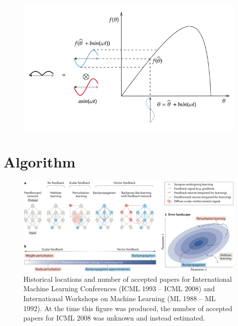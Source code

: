 \documentclass[nohyperref]{article}
\theoremstyle{plain}
\theoremstyle{definition}
\theoremstyle{remark}
\begin{document}
\begin{figure}[ht]
\vskip 0.2in
\begin{center}
\centerline{\includegraphics[width=\columnwidth]{images/esc_increasing_objective.png}}
\caption{}
\end{center}
\vskip -0.2in
\end{figure}


\section{Algorithm}
\begin{figure}[ht]
\vskip 0.2in
\begin{center}
\centerline{\includegraphics[width=2\columnwidth]{images/grad_landscape.png}}
\caption{Historical locations and number of accepted papers for International
Machine Learning Conferences (ICML 1993 -- ICML 2008) and International
Workshops on Machine Learning (ML 1988 -- ML 1992). At the time this figure was
produced, the number of accepted papers for ICML 2008 was unknown and instead
estimated.}
\label{grad_landscape}
\end{center}
\vskip -0.2in
\end{figure}
\end{document}
